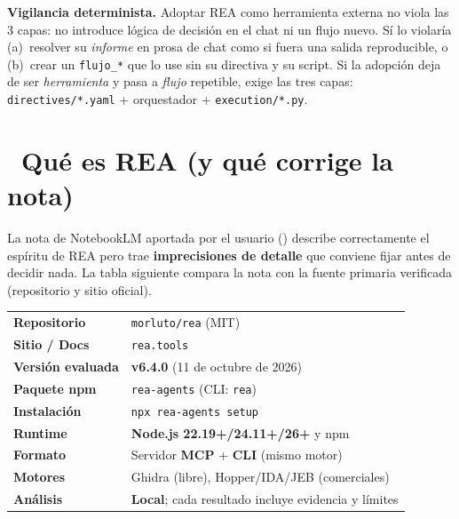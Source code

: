 \documentclass[11pt,a4paper]{article}
\newcommand{\iconotexto}[2]{\textcolor{cyanNeon}{\faIcon{#1}}~#2}
\begin{document}
\begin{cajaRecuerda}
\textbf{Vigilancia determinista.} Adoptar REA como herramienta externa no viola las 3
capas: no introduce lógica de decisión en el chat ni un flujo nuevo. Sí lo violaría
(a)~resolver su \emph{informe} en prosa de chat como si fuera una salida reproducible, o
(b)~crear un \texttt{flujo\_*} que lo use sin su directiva y su script. Si la adopción deja
de ser \emph{herramienta} y pasa a \emph{flujo} repetible, exige las tres capas:
\texttt{directives/*.yaml} + orquestador + \texttt{execution/*.py}.
\end{cajaRecuerda}

\section[Qué es REA]{\iconotexto{sitemap}{Qué es REA (y qué corrige la nota)}}

La nota de NotebookLM aportada por el usuario
() describe correctamente el
espíritu de REA pero trae \textbf{imprecisiones de detalle} que conviene fijar antes de
decidir nada. La tabla siguiente compara la nota con la fuente primaria verificada
(repositorio y sitio oficial).

\begin{tcolorbox}[tarjetaDato, title={\faIcon{tools}~Ficha de la herramienta (verificada)}]
\begin{tabular}{ll}
\toprule
\textbf{Repositorio} & \texttt{morluto/rea} (MIT) \\
\textbf{Sitio / Docs} & \texttt{rea.tools} \\
\textbf{Versión evaluada} & \textbf{v6.4.0} (11 de octubre de 2026) \\
\textbf{Paquete npm} & \texttt{rea-agents} (CLI: \texttt{rea}) \\
\textbf{Instalación} & \texttt{npx rea-agents setup} \\
\textbf{Runtime} & \textbf{Node.js 22.19+/24.11+/26+} y npm \\
\textbf{Formato} & Servidor \textbf{MCP} + \textbf{CLI} (mismo motor) \\
\textbf{Motores} & Ghidra (libre), Hopper/IDA/JEB (comerciales) \\
\textbf{Análisis} & \textbf{Local}; cada resultado incluye evidencia y límites \\
\bottomrule
\end{tabular}
\end{tcolorbox}
\end{document}

